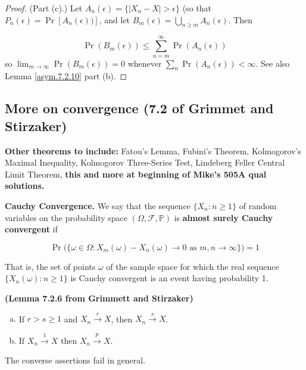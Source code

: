 \begin{proof}(Part (c).) Let \(A_n(\epsilon) = \{|X_n - X| > \epsilon\}\) (so that \(P_n(\epsilon) = \Pr[A_n(\epsilon))]\), and let \(B_m(\epsilon) = \bigcup_{n \geq m} A_n(\epsilon)\). Then

\[
\Pr(B_m(\epsilon)) \leq \sum_{n=m}^\infty \Pr(A_n(\epsilon))
\]
so \(\lim_{m \to \infty} \Pr(B_m(\epsilon)) = 0\) whenever \(\sum_n \Pr(A_n(\epsilon)) < \infty\). See also Lemma \ref{asym.7.2.10} part (b).\end{proof}

\subsection{More on convergence (7.2 of Grimmet and Stirzaker)}

\textbf{Other theorems to include:} Fatou's Lemma, Fubini's Theorem, Kolmogorov's Maximal Inequality, Kolmogorov Three-Series Test, Lindeberg Feller Central Limit Theorem, \textbf{this and more at beginning of Mike's 505A qual solutions.}

\begin{definition} \textbf{Cauchy Convergence.} We say that the sequence \(\{X_n: n \geq 1\}\) of random variables on the probability space \((\Omega, \mathcal{F}, \mathbb{P})\) is \textbf{almost surely Cauchy convergent} if

\[
\Pr \big( \{\omega \in \Omega: X_m(\omega) - X_n(\omega) \to 0 \text{ as } m, n \to \infty \} \big) = 1
\]

That is, the set of points \(\omega\) of the sample space for which the real sequence \(\{X_n(\omega): n \geq 1\}\) is Cauchy convergent is an event having probability 1.
\end{definition}

\begin{lemma}\label{asym.7.2.6} \textbf{(Lemma 7.2.6 from Grimmett and Stirzaker)} 
\begin{enumerate}[(a)]
\item If \(r > s \geq 1\) and \(X_n \xrightarrow{r} X\), then \(X_n \xrightarrow{s} X\).
\item If \(X_n \xrightarrow{1} X\) then \(X_n \xrightarrow{p} X\). 
\end{enumerate}
The converse assertions fail in general.
\end{lemma}


